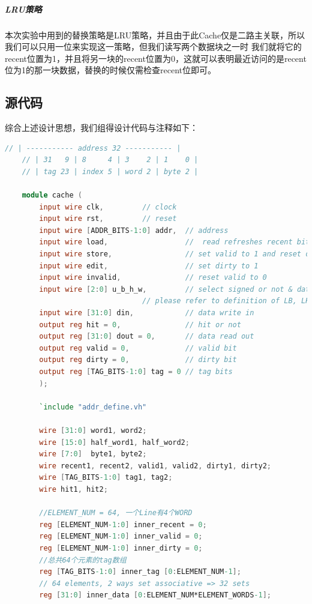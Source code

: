 \subparagraph{LRU策略} 本次实验中用到的替换策略是LRU策略，并且由于此Cache仅是二路主关联，所以我们可以只用一位来实现这一策略，但我们读写两个数据块之一时
我们就将它的recent位置为1，并且将另一块的recent位置为0，这就可以表明最近访问的是recent位为1的那一块数据，替换的时候仅需检查recent位即可。

\subsection{源代码}
综合上述设计思想，我们组得设计代码与注释如下：

\begin{lstlisting}[language = {verilog}]
    // | ----------- address 32 ----------- |
    // | 31   9 | 8     4 | 3    2 | 1    0 |
    // | tag 23 | index 5 | word 2 | byte 2 |
    
    module cache (
        input wire clk,         // clock
        input wire rst,         // reset
        input wire [ADDR_BITS-1:0] addr,  // address
        input wire load,                  //  read refreshes recent bit
        input wire store,                 // set valid to 1 and reset dirty to 0
        input wire edit,                  // set dirty to 1
        input wire invalid,               // reset valid to 0
        input wire [2:0] u_b_h_w,         // select signed or not & data width
                                // please refer to definition of LB, LH, LW, LBU, LHU in RV32I Instruction Set  
        input wire [31:0] din,            // data write in
        output reg hit = 0,               // hit or not
        output reg [31:0] dout = 0,       // data read out
        output reg valid = 0,             // valid bit
        output reg dirty = 0,             // dirty bit
        output reg [TAG_BITS-1:0] tag = 0 // tag bits
        );
    
        `include "addr_define.vh"
    
        wire [31:0] word1, word2;
        wire [15:0] half_word1, half_word2;
        wire [7:0]  byte1, byte2;
        wire recent1, recent2, valid1, valid2, dirty1, dirty2;
        wire [TAG_BITS-1:0] tag1, tag2;
        wire hit1, hit2;
    
        //ELEMENT_NUM = 64, 一个Line有4个WORD
        reg [ELEMENT_NUM-1:0] inner_recent = 0;
        reg [ELEMENT_NUM-1:0] inner_valid = 0;
        reg [ELEMENT_NUM-1:0] inner_dirty = 0;
        //总共64个元素的tag数组
        reg [TAG_BITS-1:0] inner_tag [0:ELEMENT_NUM-1];
        // 64 elements, 2 ways set associative => 32 sets
        reg [31:0] inner_data [0:ELEMENT_NUM*ELEMENT_WORDS-1];
    

\end{lstlisting}
